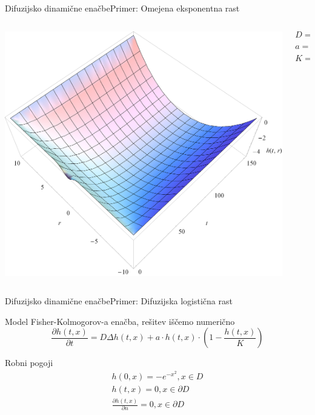 \documentclass{beamer}
\begin{document}
\begin{frame}{Difuzijsko dinamične enačbe}{Primer:  Omejena eksponentna rast}
\begin{columns}
  \begin{column}{0.8\textwidth}
    \includegraphics[width=1.05\textwidth]{slike/difuzija-omejena-eksponentna-rast2.png}
  \end{column}
  \begin{column}{0.3\textwidth}
    \footnotesize
    \[ D = 1 \]
    \[ a = \frac{1}{50} \]
    \[ K = -10 \]
  \end{column}
\end{columns}
\end{frame}


\begin{frame}{Difuzijsko dinamične enačbe}{Primer: Difuzijska logistična rast}
\begin{block}{Model}
  Fisher-Kolmogorov-a enačba, rešitev iščemo numerično
  \begin{equation} \frac{ \partial h(t,x) }{ \partial t} = D \Delta h(t,x) + a \cdot h(t,x) \cdot (1 - \frac{h(t,x)}{K}) \end{equation} 
\end{block}
\begin{block}{Robni pogoji}
        \begin{equation}
          \begin{aligned}
            h(0,x) =  - e^{-x^2}, x \in D \\
            h(t,x) = 0, x \in \partial D \\
            \frac{\partial h(t,x)}{\partial n} = 0, x \in \partial D \\
          \end{aligned}
        \end{equation}
\end{block}
\end{frame}
\end{document}
